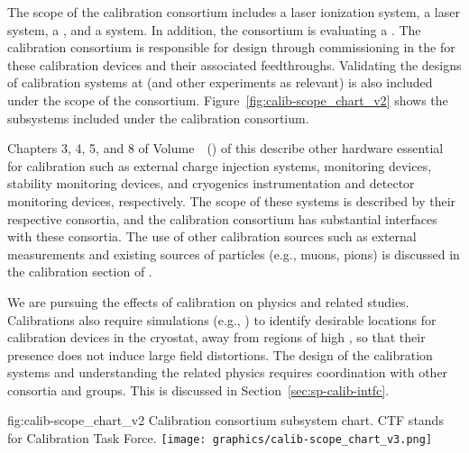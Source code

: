 
The scope of the calibration consortium includes a laser ionization system, a \phel laser system, a 
, 
and a  system. In addition, the consortium is evaluating a .
The calibration consortium is responsible for design through commissioning in the  for these calibration devices and their associated feedthroughs. Validating the designs of calibration systems at  (and other experiments as relevant) is also included under the scope of the consortium. Figure~\ref{fig:calib-scope_chart_v2} shows the subsystems included under the calibration consortium. 


Chapters 3, 4, 5, and 8 of Volume~\volnumbersp~(\voltitlesp) of this  describe other hardware essential for calibration such as  external charge injection systems,  monitoring devices,  stability monitoring devices, and cryogenics instrumentation and detector monitoring devices, respectively. The scope of these systems is described by their respective consortia, and the calibration consortium has substantial interfaces with these consortia. 
The use of other calibration sources such as external measurements and existing sources of particles (e.g., muons, pions) is discussed in the calibration section of  \physchtools. 
 
We are pursuing the effects of calibration on physics and related studies. %
Calibrations also require simulations (e.g., \efield) to identify desirable locations for calibration devices in the cryostat, away from regions of high \efield, so that their presence does not induce large field distortions. 
The design of the calibration systems and understanding the related physics requires coordination with other consortia and groups. This is discussed in Section~\ref{sec:sp-calib-intfc}.

\begin{dunefigure}{fig:calib-scope_chart_v2}
{Calibration consortium subsystem chart. CTF stands for Calibration Task Force.}
\texttt{[image: graphics/calib-scope\_chart\_v3.png]}
\end{dunefigure}

